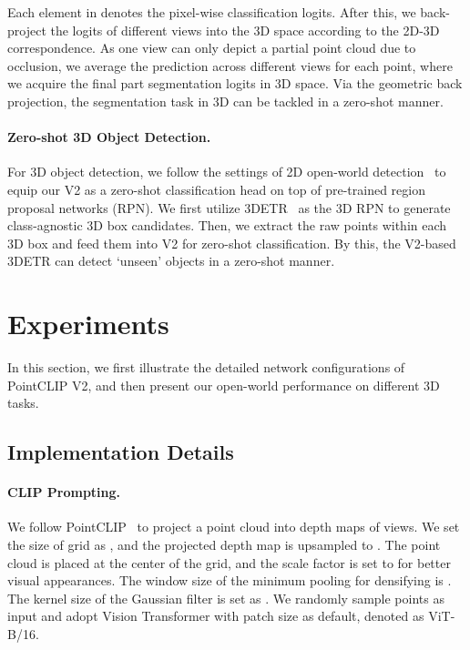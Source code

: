 \documentclass[10pt,twocolumn,letterpaper]{article}
\begin{document}
Each element in  denotes the pixel-wise classification logits. After this, we back-project the logits of different views into the 3D space according to the 2D-3D correspondence. As one view can only depict a partial point cloud due to occlusion, we average the prediction across different views for each point, where we acquire the final part segmentation logits in 3D space. Via the geometric back projection, the segmentation task in 3D can be tackled in a zero-shot manner.

\vspace{-0.2cm}
\paragraph{Zero-shot 3D Object Detection.}
For 3D object detection, we follow the settings of 2D open-world detection~\cite{gu2021open, zhong2022regionclip} to equip our V2 as a zero-shot classification head on top of pre-trained region proposal networks (RPN). 
We first utilize 3DETR~\cite{misra2021end} as the 3D RPN to generate class-agnostic 3D box candidates.
Then, we extract the raw points within each 3D box and feed them into V2 for zero-shot classification. 
By this, the V2-based 3DETR can detect `unseen' objects in a zero-shot manner.


\section{Experiments}
\label{sec:experiments}

In this section, we first illustrate the detailed network configurations of PointCLIP V2, and then present our open-world performance on different 3D tasks.

\subsection{Implementation Details}
\paragraph{CLIP Prompting.} 
We follow PointCLIP~\cite{zhang2022pointclip} to project a point cloud into depth maps of  views. We set the size of grid  as , and the projected depth map is upsampled to . The point cloud is placed at the center of the grid, and the scale factor  is set to  for better visual appearances. The window size of the minimum pooling for densifying is . The kernel size of the Gaussian filter is set as . We randomly sample  points as input and adopt Vision Transformer \cite{dosovitskiy2020image} with patch size  as default, denoted as ViT-B/16. 
\end{document}
